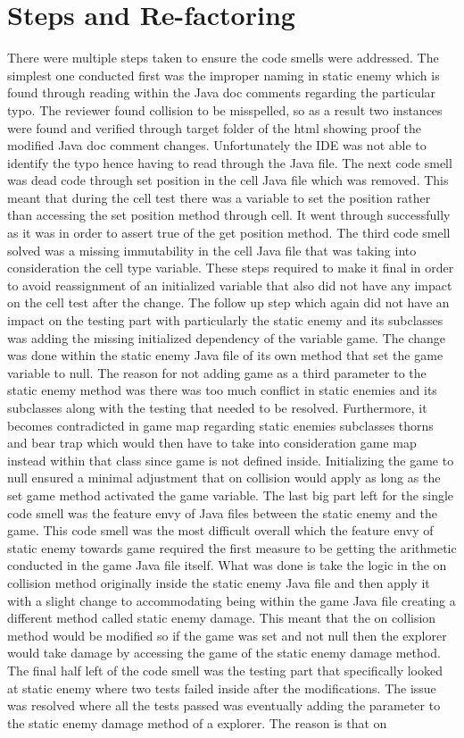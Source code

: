 \documentclass[12pt,letterpaper]{article}
\begin{document}
\section{Steps and Re-factoring}
There were multiple steps taken to ensure the code smells were addressed. The simplest one conducted first was the improper naming in static enemy which is found through reading within the Java doc comments regarding the particular typo. The reviewer found collision to be misspelled, so as a result two instances were found and verified through target folder of the html showing proof the modified Java doc comment changes. Unfortunately the IDE was not able to identify the typo hence having to read through the Java file. The next code smell was dead code through set position in the cell Java file which was removed. This meant that during the cell test there was a variable to set the position rather than accessing the set position method through cell. It went through successfully as it was in order to assert true of the get position method. The third code smell solved was a missing immutability in the cell Java file that was taking into consideration the cell type variable. These steps required to make it final in order to avoid reassignment of an initialized variable that also did not have any impact on the cell test after the change. The follow up step which again did not have an impact on the testing part with particularly the static enemy and its subclasses was adding the missing initialized dependency of the variable game. The change was done within the static enemy Java file of its own method that set the game variable to null. The reason for not adding game as a third parameter to the static enemy method was there was too much conflict in static enemies and its subclasses along with the testing that needed to be resolved. Furthermore, it becomes contradicted in game map regarding static enemies subclasses thorns and bear trap which would then have to take into consideration game map instead within that class since game is not defined inside. Initializing the game to null ensured a minimal adjustment that on collision would apply as long as the set game method activated the game variable. The last big part left for the single code smell was the feature envy of Java files between the static enemy and the game. This code smell was the most difficult overall which the feature envy of static enemy towards game required the first measure to be getting the arithmetic conducted in the game Java file itself. What was done is take the logic in the on collision method originally inside the static enemy Java file and then apply it with a slight change to accommodating being within the game Java file creating a different method called static enemy damage. This meant that the on collision method would be modified so if the game was set and not null then the explorer would take damage by accessing the game of the static enemy damage method. The final half left of the code smell was the testing part that specifically looked at static enemy where two tests failed inside after the modifications. The issue was resolved where all the tests passed was eventually adding the parameter to the static enemy damage method of a explorer. The reason is that on 
\end{document}
